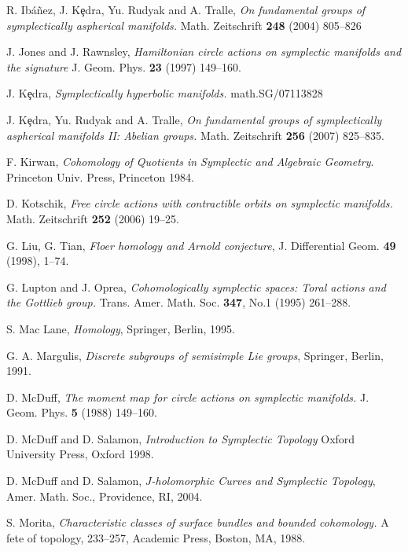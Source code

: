 \documentclass[12pt]{amsart}
\numberwithin{equation}{section}
\theoremstyle{definition}
\theoremstyle{remark}
\numberwithin{figure}{section}
\numberwithin{table}{section}
\begin{document}
\begin{thebibliography}{ABCDE}
R. Ib{\'a}{\~n}ez, J. K{\c{e}}dra, Yu. Rudyak and A. Tralle, 
{\em On fundamental groups of symplectically aspherical manifolds.} Math.  
Zeitschrift 
{\bf 248} (2004) 805--826 
 
J. Jones and J. Rawnsley, {\em Hamiltonian circle actions on symplectic  
manifolds and the signature} 
J. Geom. Phys. {\bf 23} (1997) 149--160. 
 
J. K\c edra, {\em Symplectically hyperbolic manifolds.} math.SG/07113828 
 
J. K{\c{e}}dra, Yu. Rudyak and A. Tralle, 
{\em On fundamental groups of symplectically aspherical manifolds II: 
Abelian groups.} Math. Zeitschrift 
{\bf 256} (2007) 825--835. 
 
 F. Kirwan, {\em Cohomology of Quotients in Symplectic and  
Algebraic Geometry}. 
Princeton Univ. Press, Princeton 1984. 
 
 D. Kotschik, {\em Free circle actions with contractible orbits  
on symplectic manifolds.} 
Math. Zeitschrift {\bf 252} (2006) 19--25. 
 
 G. Liu, G. Tian,
{\em Floer homology and Arnold conjecture},
J. Differential Geom. {\bf 49} (1998),  1--74. 

G. Lupton and  J. Oprea, {\em Cohomologically symplectic spaces: Toral actions  
and the Gottlieb group.} 
Trans. Amer. Math. Soc.  {\bf 347}, No.1 (1995) 261--288.  
 
S. Mac Lane, {\it Homology}, Springer, Berlin, 1995. 
 
G. A. Margulis, {\it Discrete subgroups of semisimple {L}ie groups},  
Springer, Berlin, 1991. 
 
 D. McDuff,  {\em The moment map for circle actions on  
symplectic manifolds.}  
J. Geom. Phys. {\bf 5} (1988) 149--160. 
 
D. McDuff and D. Salamon, {\em Introduction to Symplectic Topology} 
Oxford University Press, Oxford 1998. 
 
D. McDuff and D. Salamon, {\em $J$-holomorphic Curves and Symplectic Topology},  
Amer. Math. Soc., Providence, RI, 2004. 
 
S. Morita, {\em Characteristic classes of surface bundles and bounded 
cohomology.}   
A fete of topology,  233--257, Academic Press, Boston, MA, 1988. 
 

\end{thebibliography}
\end{document}
